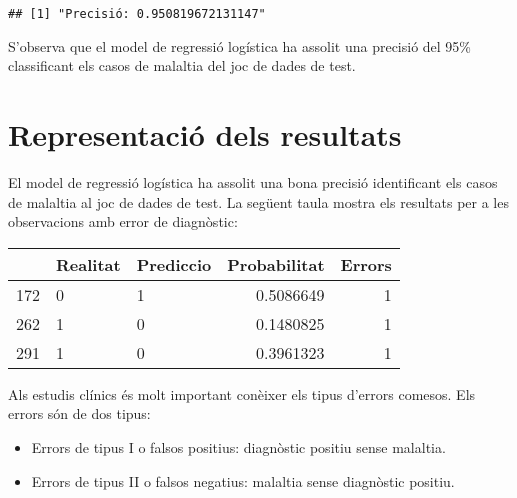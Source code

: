 \documentclass[12,]{article}
\newenvironment{Shaded}{\begin{snugshade}}{\end{snugshade}}
\newcommand{\DataTypeTok}[1]{\textcolor[rgb]{0.13,0.29,0.53}{#1}}
\newcommand{\DecValTok}[1]{\textcolor[rgb]{0.00,0.00,0.81}{#1}}
\newcommand{\KeywordTok}[1]{\textcolor[rgb]{0.13,0.29,0.53}{\textbf{#1}}}
\newcommand{\NormalTok}[1]{#1}
\newcommand{\OperatorTok}[1]{\textcolor[rgb]{0.81,0.36,0.00}{\textbf{#1}}}
\newcommand{\StringTok}[1]{\textcolor[rgb]{0.31,0.60,0.02}{#1}}
\providecommand{\tightlist}{%
  \setlength{\itemsep}{0pt}\setlength{\parskip}{0pt}}
\begin{document}
\begin{Shaded}
\end{Shaded}

\begin{verbatim}
## [1] "Precisió: 0.950819672131147"
\end{verbatim}

S'observa que el model de regressió logística ha assolit una precisió
del 95\% classificant els casos de malaltia del joc de dades de test.

\hypertarget{representacio-dels-resultats}{%
\section{Representació dels
resultats}\label{representacio-dels-resultats}}

El model de regressió logística ha assolit una bona precisió
identificant els casos de malaltia al joc de dades de test. La següent
taula mostra els resultats per a les observacions amb error de
diagnòstic:

\begin{Shaded}
\end{Shaded}

\begin{longtable}[]{@{}lllrr@{}}
\toprule
& Realitat & Prediccio & Probabilitat & Errors\tabularnewline
\midrule
\endhead
172 & 0 & 1 & 0.5086649 & 1\tabularnewline
262 & 1 & 0 & 0.1480825 & 1\tabularnewline
291 & 1 & 0 & 0.3961323 & 1\tabularnewline
\bottomrule
\end{longtable}

Als estudis clínics és molt important conèixer els tipus d'errors
comesos. Els errors són de dos tipus:

\begin{itemize}
\tightlist
\item
  Errors de tipus I o falsos positius: diagnòstic positiu sense
  malaltia.
\item
  Errors de tipus II o falsos negatius: malaltia sense diagnòstic
  positiu.
\end{itemize}
\end{document}
